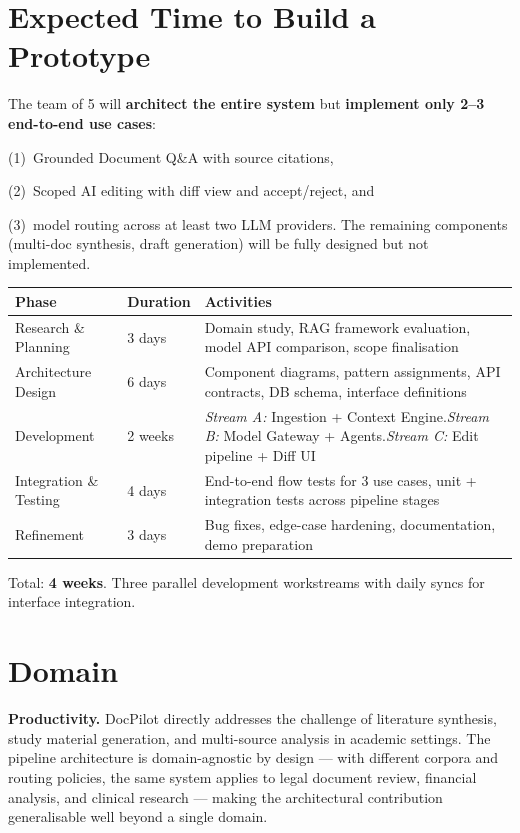 \documentclass[10pt]{article}
\begin{document}
\vspace{2pt}

\section{Expected Time to Build a Prototype}

The team of 5 will \textbf{architect the entire system} but \textbf{implement only 2--3 end-to-end use cases}:

(1)~Grounded Document Q\&A with source citations,

(2)~Scoped AI editing with diff view and accept/reject, and

(3)~model routing across at least two LLM providers. The remaining components (multi-doc synthesis, draft generation) will be fully designed but not implemented.

\vspace{4pt}
\begin{tabular}{@{} p{3.0cm} p{1.3cm} p{9.4cm} @{}}
\toprule
\textbf{Phase} & \textbf{Duration} & \textbf{Activities} \\
\midrule
Research \& Planning   & 3 days  & Domain study, RAG framework evaluation, model API comparison, scope finalisation \\
Architecture Design    & 6 days  & Component diagrams, pattern assignments, API contracts, DB schema, interface definitions \\
Development            & 2 weeks & \textit{Stream A:} Ingestion + Context Engine.\quad \textit{Stream B:} Model Gateway + Agents.\quad \textit{Stream C:} Edit pipeline + Diff UI \\
Integration \& Testing & 4 days  & End-to-end flow tests for 3 use cases, unit + integration tests across pipeline stages \\
Refinement             & 3 days  & Bug fixes, edge-case hardening, documentation, demo preparation \\
\bottomrule
\end{tabular}
\vspace{3pt}

\noindent Total: \textbf{4 weeks}. Three parallel development workstreams with daily syncs for interface integration.

\section{Domain}

\textbf{Productivity.} DocPilot directly addresses the challenge of literature synthesis, study material generation, and multi-source analysis in academic settings. The pipeline architecture is domain-agnostic by design --- with different corpora and routing policies, the same system applies to legal document review, financial analysis, and clinical research --- making the architectural contribution generalisable well beyond a single domain.
\end{document}

